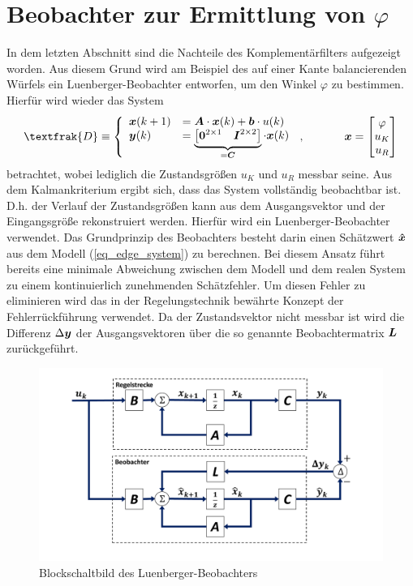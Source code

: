 \section{Beobachter zur Ermittlung von $\varphi$}
In dem letzten Abschnitt sind die Nachteile des Komplementärfilters aufgezeigt worden. Aus diesem Grund wird am Beispiel des auf einer Kante balancierenden Würfels ein Luenberger-Beobachter entworfen, um den Winkel $\varphi$ zu bestimmen. Hierfür wird wieder das System
\begin{equation}
\textfrak{D} \equiv \left\{ \begin{array}{ll}
\bs{x}(k+1) &= \bs{A}\cdot \bs{x}(k) + \bs{b}\cdot u(k)
\\
\bs{y}(k) &= \underbrace{\begin{bmatrix}
\bs{0}^{2\times 1} & \bs{I}^{2\times 2}
\end{bmatrix}}_{= \bs{C}} \cdot \bs{x}(k)
\end{array}\right.\,, \hspace{35pt} \bs{x}=\begin{bmatrix}
\varphi \\ u_K \\ u_R
\end{bmatrix}
\label{eq_edge_system}
\end{equation}
betrachtet, wobei lediglich die Zustandsgrößen $u_K$ und $u_R$ messbar seine. Aus dem Kalmankriterium ergibt sich, dass das System vollständig beobachtbar ist. D.h. der Verlauf der Zustandsgrößen kann aus dem Ausgangsvektor und der Eingangsgröße rekonstruiert werden. Hierfür wird ein Luenberger-Beobachter verwendet. Das Grundprinzip des Beobachters besteht darin einen Schätzwert $\boldsymbol{\hat{x}}$ aus dem Modell (\ref{eq_edge_system}) zu berechnen. Bei diesem Ansatz führt bereits eine minimale Abweichung zwischen dem Modell und dem realen System zu einem kontinuierlich zunehmenden Schätzfehler. Um diesen Fehler zu eliminieren wird das in der Regelungstechnik bewährte Konzept der Fehlerrückführung verwendet. Da der Zustandsvektor nicht messbar ist wird  die Differenz $\Delta \boldsymbol{y}$ der Ausgangsvektoren über die so genannte Beobachtermatrix $\boldsymbol{L}$ zurückgeführt.
\begin{figure}[h!]
\centering
\includegraphics[width=1\linewidth, trim={1cm 1cm 1cm 1cm}, clip]{img/Observer}
\caption{Blockschaltbild des Luenberger-Beobachters}
\end{figure}

